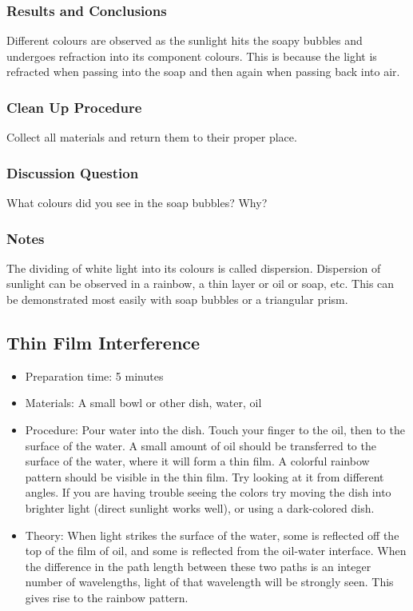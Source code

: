 \subsubsection*{Results and Conclusions}
Different colours are observed as the sunlight hits the soapy bubbles and undergoes refraction into its component colours.  This is because the light is refracted when passing into the soap and then again when passing back into air.

\subsubsection*{Clean Up Procedure}
Collect all materials and return them to their proper place.

\subsubsection*{Discussion Question}
What colours did you see in the soap bubbles? Why?

\subsubsection*{Notes}
The dividing of white light into its colours is called dispersion.  Dispersion of sunlight can be observed in a rainbow, a thin layer or oil or soap, etc.  This can be demonstrated most easily with soap bubbles or a triangular prism.



\subsection{Thin Film Interference}
\begin{itemize}
\item{Preparation time: 5 minutes}
\item{Materials: A small bowl or other dish, water, oil}
\item{Procedure: Pour water into the dish. Touch your finger to the oil, then to the surface of the water. A small amount of oil should be transferred to the surface of the water, where it will form a thin film. A colorful rainbow pattern should be visible in the thin film. Try looking at it from different angles. If you are having trouble seeing the colors try moving the dish into brighter light (direct sunlight works well), or using a dark-colored dish.}
\item{Theory: When light strikes the surface of the water, some is reflected off the top of the film of oil, and some is reflected from the oil-water interface. When the difference in the path length between these two paths is an integer number of wavelengths, light of that wavelength will be strongly seen. This gives rise to the rainbow pattern.}
\end{itemize}

